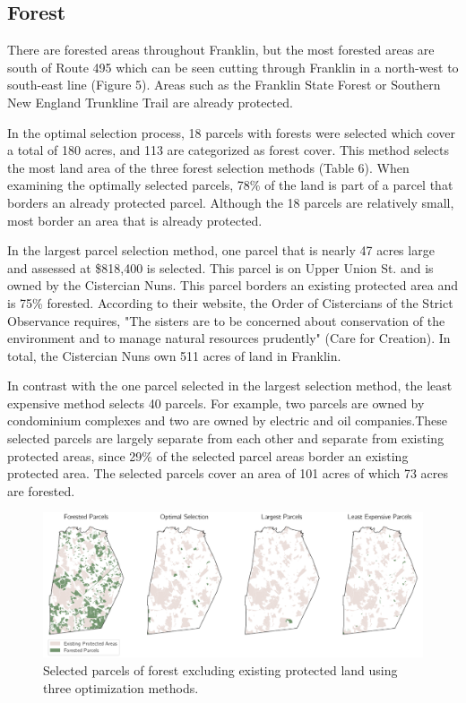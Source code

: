 \documentclass[12pt, stu, floatsintext,table]{apa7}
\begin{document}
\subsection{Forest}
 There are forested areas throughout Franklin, but the most forested areas are south of Route 495 which can be seen cutting through Franklin in a north-west to south-east line (Figure 5). Areas such as the Franklin State Forest or Southern New England Trunkline Trail are already protected.
 
 In the optimal selection process, 18 parcels with forests were selected which cover a total of 180 acres, and 113 are categorized as forest cover. This method selects the most land area of the three forest selection methods (Table 6). When examining the optimally selected parcels, 78\% of the land is part of a parcel that borders an already protected parcel. Although the 18 parcels are relatively small, most border an area that is already protected. 
 
 In the largest parcel selection method, one parcel that is nearly 47 acres large and assessed at \$818,400 is selected. This parcel is on Upper Union St. and is owned by the Cistercian Nuns. This parcel borders an existing protected area and is 75\% forested. According to their website, the Order of Cistercians of the Strict Observance requires, "The sisters are to be concerned about conservation of the environment and to manage natural resources prudently" (Care for Creation). In total, the Cistercian Nuns own 511 acres of land in Franklin. 
 
 In contrast with the one parcel selected in the largest selection method, the least expensive method selects 40 parcels. For example, two parcels are owned by condominium complexes and two are owned by electric and oil companies.These selected parcels are largely separate from each other and separate from existing protected areas, since 29\% of the selected parcel areas border an existing protected area. The selected parcels cover an area of 101 acres of which 73 acres are forested.  
 
\begin{figure}[hbtp]
    \centering
    \includegraphics[width = \textwidth]{figures/n_61forest.png}
    \caption{Selected parcels of forest excluding existing protected land using three optimization methods. }
\end{figure}
\end{document}
